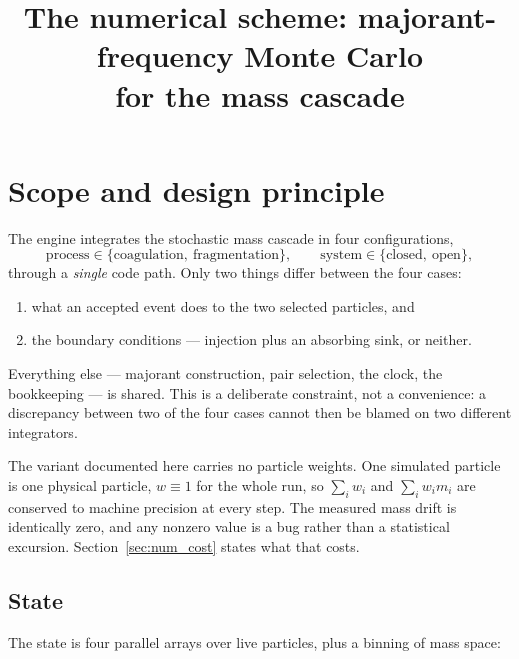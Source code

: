 \documentclass[a4paper,12pt]{article}
\begin{document}
\title{The numerical scheme: majorant-frequency Monte Carlo\\ for the mass cascade}
\author{}
\date{}
\maketitle

\section{Scope and design principle}
\label{sec:num_scope}

The engine integrates the stochastic mass cascade in four configurations,
\[
  \text{process} \in \{\text{coagulation},\ \text{fragmentation}\},
  \qquad
  \text{system} \in \{\text{closed},\ \text{open}\},
\]
through a \emph{single} code path. Only two things differ between the four
cases:

\begin{enumerate}
  \item what an accepted event does to the two selected particles, and
  \item the boundary conditions --- injection plus an absorbing sink, or
        neither.
\end{enumerate}

Everything else --- majorant construction, pair selection, the clock, the
bookkeeping --- is shared. This is a deliberate constraint, not a
convenience: a discrepancy between two of the four cases cannot then be
blamed on two different integrators.

The variant documented here carries no particle weights. One simulated
particle is one physical particle, $w \equiv 1$ for the whole run, so
$\sum_i w_i$ and $\sum_i w_i m_i$ are conserved to machine precision at
every step. The measured mass drift is identically zero, and any nonzero
value is a bug rather than a statistical excursion. Section~\ref{sec:num_cost}
states what that costs.

\subsection{State}

The state is four parallel arrays over live particles, plus a binning of
mass space:
\end{document}
